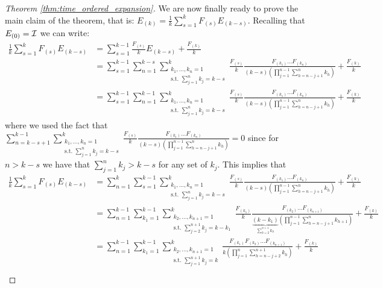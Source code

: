 \begin{proof}[Theorem \ref{thm:time_ordered_expansion}]
    We are now finally ready to prove the main claim of the theorem, that is: \(E_{(k)} = \frac{1}{k}\sum_{s=1}^{k}F_{(s)}E_{(k-s)}.\)
    Recalling that $E_{(0)}=\mathcal{I}$ we can write:
    \begin{align*}
        \frac{1}{k}\sum_{s=1}^{k} F_{(s)} E_{(k-s)}  &= \sum_{s=1}^{k-1} \frac{F_{(s)}}{k} E_{(k-s)} + \frac{F_{(k)}}{k} \\
        &= \sum_{s=1}^{k-1} \sum_{n=1}^{k-s} \sum_{\substack{{k_1,\dots,k_{n} = 1}\\{\text{s.t. }\sum_{j=1}^{n}k_{j}=k-s}}}^{k} \frac{F_{(s)}}{k} \frac{ F_{(k_1)}\dots F_{(k_n)}}{(k-s)(\prod_{j=1}^{n-1} \sum_{h=n-j+1}^n k_h)} + \frac{F_{(k)}}{k} \\
        &= \sum_{s=1}^{k-1}\sum_{n=1}^{k-1} \sum_{\substack{{k_1,\dots,k_{n} = 1}\\{\text{s.t. }\sum_{j=1}^{n}k_{j}=k-s}}}^{k} \frac{F_{(s)}}{k} \frac{ F_{(k_1)}\dots F_{(k_n)}}{(k-s)(\prod_{j=1}^{n-1} \sum_{h=n-j+1}^n k_h)} + \frac{F_{(k)}}{k}  
    \end{align*}
    where we used the fact that $\sum_{n=k-s+1}^{k-1} \sum_{\substack{{k_1,\dots,k_{n} = 1}\\{\text{s.t. }\sum_{j=1}^{n}k_{j}=k-s}}}^{k} \frac{F_{(s)}}{k} \frac{ F_{(k_1)}\dots F_{(k_n)}}{(k-s)(\prod_{j=1}^{n-1} \sum_{h=n-j+1}^n k_h)} = 0$ since for $n>k-s$ we have that $\sum_{j=1}^{n}k_{j} > k-s$ for any set of $k_j$. This implies that
    \begin{align*}
        \frac{1}{k}\sum_{s=1}^{k} F_{(s)}E_{(k-s)}  
        &= \sum_{n=1}^{k} \sum_{s=1}^{k-1} \sum_{\substack{{k_1,\dots,k_{n} = 1}\\{\text{s.t. }\sum_{j=1}^{n}k_{j}=k-s}}}^{k} \frac{F_{(s)}}{k} \frac{ F_{(k_1)}\dots F_{(k_n)}}{(k-s)(\prod_{j=1}^{n-1} \sum_{h=n-j+1}^n k_h)} +\frac{F_{(k)}}{k} \\
        &= \sum_{n=1}^{k-1} \sum_{k_1=1}^{k-1} \sum_{\substack{{k_2,\dots,k_{n+1} = 1}\\{\text{s.t. }\sum_{j=2}^{n+1}k_{j}=k-k_1}}}^{k} \frac{F_{(k_1)}}{k} \frac{ F_{(k_2)}\dots F_{(k_{n+1})}}{\underbrace{(k-k_1)}_{\sum_{h=2}^{n+1}k_h}(\prod_{j=1}^{n-1} \sum_{h=n-j+1}^n k_{h+1})} +\frac{F_{(k)}}{k} \\
        &= \sum_{n=1}^{k-1} \sum_{k_1=1}^{k-1} \sum_{\substack{{k_2,\dots,k_{n+1} = 1}\\{\text{s.t. }\sum_{j=1}^{n+1}k_{j}=k}}}^{k} \frac{F_{(k_1)} F_{(k_2)}\dots F_{(k_{n+1})}}{k(\prod_{j=1}^{n} \sum_{h=n-j+2}^{n+1} k_{h})} +\frac{F_{(k)}}{k} \\

\end{align*}
\end{proof}
